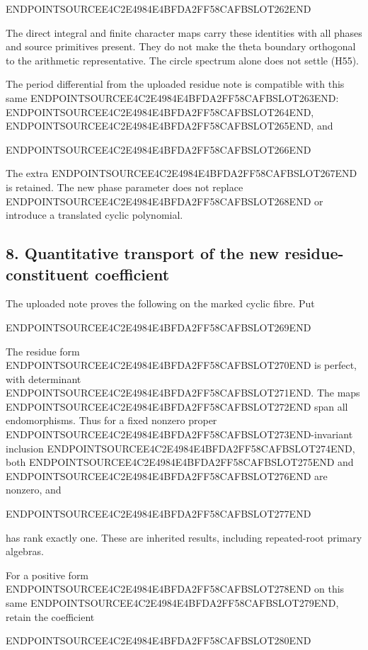ENDPOINTSOURCEE4C2E4984E4BFDA2FF58CAFBSLOT262END

The direct integral and finite character maps carry these identities with all phases and source primitives present. They do not make the theta boundary orthogonal to the arithmetic representative. The circle spectrum alone does not settle (H55).

The period differential from the uploaded residue note is compatible with this same ENDPOINTSOURCEE4C2E4984E4BFDA2FF58CAFBSLOT263END: ENDPOINTSOURCEE4C2E4984E4BFDA2FF58CAFBSLOT264END, ENDPOINTSOURCEE4C2E4984E4BFDA2FF58CAFBSLOT265END, and

ENDPOINTSOURCEE4C2E4984E4BFDA2FF58CAFBSLOT266END

The extra ENDPOINTSOURCEE4C2E4984E4BFDA2FF58CAFBSLOT267END is retained. The new phase parameter does not replace ENDPOINTSOURCEE4C2E4984E4BFDA2FF58CAFBSLOT268END or introduce a translated cyclic polynomial.

\subsection{8. Quantitative transport of the new residue-constituent coefficient}\label{endpoint-holonomy_original--quantitative-transport-of-the-new-residue-constituent-coefficient}

The uploaded note proves the following on the marked cyclic fibre. Put

ENDPOINTSOURCEE4C2E4984E4BFDA2FF58CAFBSLOT269END

The residue form ENDPOINTSOURCEE4C2E4984E4BFDA2FF58CAFBSLOT270END is perfect, with determinant ENDPOINTSOURCEE4C2E4984E4BFDA2FF58CAFBSLOT271END. The maps ENDPOINTSOURCEE4C2E4984E4BFDA2FF58CAFBSLOT272END span all endomorphisms. Thus for a fixed nonzero proper ENDPOINTSOURCEE4C2E4984E4BFDA2FF58CAFBSLOT273END-invariant inclusion ENDPOINTSOURCEE4C2E4984E4BFDA2FF58CAFBSLOT274END, both ENDPOINTSOURCEE4C2E4984E4BFDA2FF58CAFBSLOT275END and ENDPOINTSOURCEE4C2E4984E4BFDA2FF58CAFBSLOT276END are nonzero, and

ENDPOINTSOURCEE4C2E4984E4BFDA2FF58CAFBSLOT277END

has rank exactly one. These are inherited results, including repeated-root primary algebras.

For a positive form ENDPOINTSOURCEE4C2E4984E4BFDA2FF58CAFBSLOT278END on this same ENDPOINTSOURCEE4C2E4984E4BFDA2FF58CAFBSLOT279END, retain the coefficient

ENDPOINTSOURCEE4C2E4984E4BFDA2FF58CAFBSLOT280END

